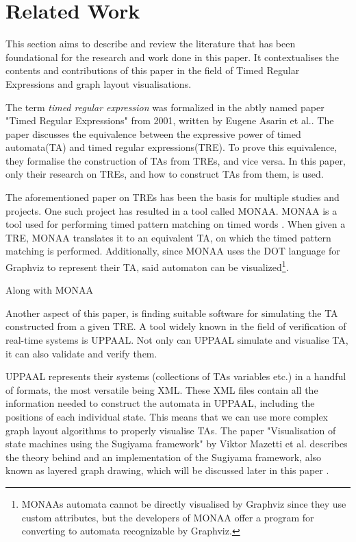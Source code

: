 \section{Related Work}\label{sec:related work}



This section aims to describe and review the literature that has been foundational for the research and work done in this paper. It contextualises the contents and contributions of this paper in the field of Timed Regular Expressions and graph layout visualisations.

The term \textit{timed regular expression} was formalized in the abtly named paper "Timed Regular Expressions" from 2001, written by Eugene Asarin et al.\cite{Eugene2001}. The paper discusses the equivalence between the expressive power of timed automata(TA)\cite{ALUR1994} and timed regular expressions(TRE). To prove this equivalence, they formalise the construction of TAs from TREs, and vice versa. In this paper, only their research on TREs, and how to construct TAs from them, is used.

The aforementioned paper on TREs has been the basis for multiple studies and projects. One such project has resulted in a tool called MONAA. MONAA is a tool used for performing timed pattern matching on timed words \cite{MONAA2017}. When given a TRE, MONAA translates it to an equivalent TA, on which the timed pattern matching is performed. Additionally, since MONAA uses the DOT language for Graphviz \cite{Graphviz} to represent their TA, said automaton can be visualized\footnote{MONAAs automata cannot be directly visualised by Graphviz since they use custom attributes, but the developers of MONAA offer a program for converting to automata recognizable by Graphviz\cite{MONAA2017}.}.

Along with MONAA

Another aspect of this paper, is finding suitable software for simulating the TA constructed from a given TRE. A tool widely known in the field of verification of real-time systems is UPPAAL. Not only can UPPAAL simulate and visualise TA, it can also validate and verify them\cite{UPPAAL}.

UPPAAL represents their systems (collections of TAs variables etc.) in a handful of formats, the most versatile being XML\cite{UPPAAL}. These XML files contain all the information needed to construct the automata in UPPAAL, including the positions of each individual state. This means that we can use more complex graph layout algorithms to properly visualise TAs. The paper "Visualisation of state machines using the Sugiyama framework" by Viktor Mazetti et al. describes the theory behind and an implementation of the Sugiyama framework, also known as layered graph drawing, which will be discussed later in this paper \cite{Mazetti2012}.